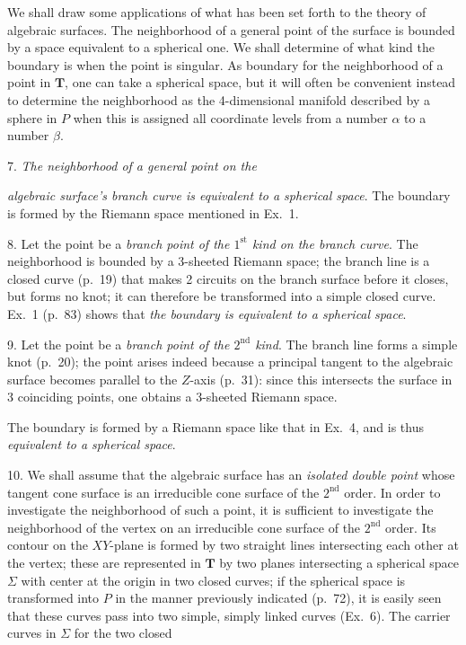 \documentclass{article}
\begin{document}
We shall draw some applications of what has been set forth to the theory of algebraic surfaces. The neighborhood of a general point of the surface is bounded by a space equivalent to a spherical one. We shall determine of what kind the boundary is when the point is singular. As boundary for the neighborhood of a point in $\mathbf{T}$, one can take a spherical space, but it will often be convenient instead to determine the neighborhood as the 4-dimensional manifold described by a sphere in $P$ when this is assigned all coordinate levels from a number $\alpha$ to a number $\beta$.

7. \emph{The neighborhood of a general point on the}

\emph{algebraic surface's branch curve is equivalent to a spherical space}. The boundary is formed by the Riemann space mentioned in Ex.\ 1.

8. Let the point be a \emph{branch point of the $1^{\text{st}}$ kind on the branch curve}. The neighborhood is bounded by a 3-sheeted Riemann space; the branch line is a closed curve (p.\ 19) that makes 2 circuits on the branch surface before it closes, but forms no knot; it can therefore be transformed into a simple closed curve. Ex.\ 1 (p.\ 83) shows that \emph{the boundary is equivalent to a spherical space}.

9. Let the point be a \emph{branch point of the $2^{\text{nd}}$ kind}. The branch line forms a simple knot (p.\ 20); the point arises indeed because a principal tangent to the algebraic surface becomes parallel to the $Z$-axis (p.\ 31): since this intersects the surface in 3 coinciding points, one obtains a 3-sheeted Riemann space.

The boundary is formed by a Riemann space like that in Ex.\ 4, and is thus \emph{equivalent to a spherical space}.

10. We shall assume that the algebraic surface has an \emph{isolated double point} whose tangent cone surface is an irreducible cone surface of the $2^{\text{nd}}$ order. In order to investigate the neighborhood of such a point, it is sufficient to investigate the neighborhood of the vertex on an irreducible cone surface of the $2^{\text{nd}}$ order. Its contour on the $XY$-plane is formed by two straight lines intersecting each other at the vertex; these are represented in $\mathbf{T}$ by two planes intersecting a spherical space $\Sigma$ with center at the origin in two closed curves; if the spherical space is transformed into $P$ in the manner previously indicated (p.\ 72), it is easily seen that these curves pass into two simple, simply linked curves (Ex.\ 6). The carrier curves in $\Sigma$ for the two closed
\end{document}
